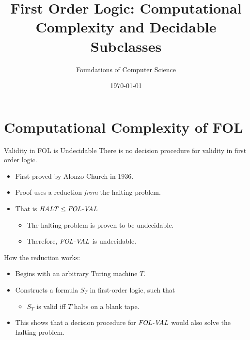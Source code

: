\documentclass[style=sailor,size=12pt]{powerdot}
\title{First Order Logic: Computational Complexity and Decidable Subclasses}
\author{Foundations of Computer Science}
\date{\today}
\begin{document}
\maketitle
\section[slide=false]{Computational Complexity of FOL}
\begin{slide}[bm=,toc=]{Validity in FOL is Undecidable}
There is no decision procedure for validity in first order logic.
\begin{itemize}
\item First proved by Alonzo Church in 1936.
\item Proof uses a reduction \emph{from} the halting problem.
\item That is $\mbox{\it HALT\/} \leq \mbox{\it FOL-VAL\/}$
\begin{itemize}
\item The halting problem is proven to be undecidable.
\item Therefore, $\mbox{\it FOL-VAL\/}$ is undecidable.
\end{itemize}
\end{itemize}
How the reduction works:
\begin{itemize}
\item Begins with an arbitrary Turing machine $T$.
\item Constructs a formula $S_T$ in first-order logic, such that
\begin{itemize}
\item $S_T$ is valid iff $T$ halts on a blank tape.
\end{itemize}
\item This shows that a decision procedure for $\mbox{\it FOL-VAL\/}$ would also solve
the halting problem.
\end{itemize}
\end{slide}
\end{document}
